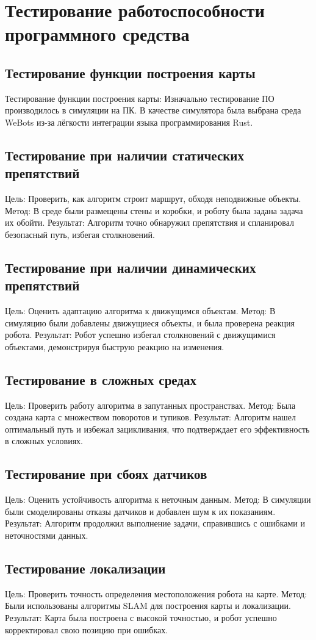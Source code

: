 \section{Тестирование работоспособности программного средства}

\subsection{Тестирование функции построения карты}
Тестирование функции построения карты:
Изначально тестирование ПО производилось в симуляции на ПК. В качестве симулятора была выбрана среда WeBots
из-за лёгкости интеграции языка программирования Rust.


\subsection{Тестирование при наличии статических препятствий}
Цель: Проверить, как алгоритм строит маршрут, обходя неподвижные объекты.
Метод: В среде были размещены стены и коробки, и роботу была задана задача их обойти.
Результат: Алгоритм точно обнаружил препятствия и спланировал безопасный путь, избегая столкновений.

\subsection{Тестирование при наличии динамических препятствий}
Цель: Оценить адаптацию алгоритма к движущимся объектам.
Метод: В симуляцию были добавлены движущиеся объекты, и была проверена реакция робота.
Результат: Робот успешно избегал столкновений с движущимися объектами, демонстрируя быструю реакцию на изменения.

\subsection{Тестирование в сложных средах}
Цель: Проверить работу алгоритма в запутанных пространствах.
Метод: Была создана карта с множеством поворотов и тупиков.
Результат: Алгоритм нашел оптимальный путь и избежал зацикливания, что подтверждает его эффективность в сложных условиях.

\subsection{Тестирование при сбоях датчиков}
Цель: Оценить устойчивость алгоритма к неточным данным.
Метод: В симуляции были смоделированы отказы датчиков и добавлен шум к их показаниям.
Результат: Алгоритм продолжил выполнение задачи, справившись с ошибками и неточностями данных.

\subsection{Тестирование локализации}
Цель: Проверить точность определения местоположения робота на карте.
Метод: Были использованы алгоритмы SLAM для построения карты и локализации.
Результат: Карта была построена с высокой точностью, и робот успешно корректировал свою позицию при ошибках.
